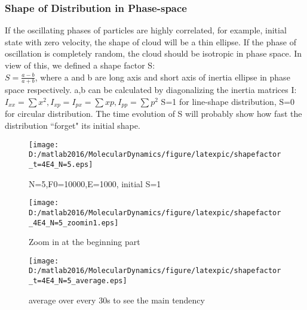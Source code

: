 \documentclass[aps,pre,twocolumn
,groupedaddress]{revtex4-1}
\begin{document}


\subsubsection{Shape of Distribution in Phase-space}
If the oscillating phases of particles are highly correlated, for example, initial state with zero velocity, the shape of cloud will be a thin ellipse. If the phase of oscillation is completely random, the cloud should be isotropic in phase space. In view of this, we defined a shape factor S:
\\$S=\frac{a-b}{a+b}$, where a and b are long axis and short axis of inertia ellipse in phase space respectively. a,b can be calculated by diagonalizing the inertia matrices I: $I_{xx}=\sum{x^2}, I_{xp}=I_{px}=\sum{xp},I_{pp}=\sum{p^2}$
S=1 for line-shape distribution, S=0 for circular distribution.
The time evolution of S will probably show how fast the distribution ``forget" its initial shape.  


\begin{figure}[hbtp]

\centering
\texttt{[image: D:/matlab2016/MolecularDynamics/figure/latexpic/shapefactor\_t=4E4\_N=5.eps]}
\caption{N=5,F0=10000,E=1000, initial S=1}
\end{figure}
\begin{figure}[hbtp]
\centering
\texttt{[image: D:/matlab2016/MolecularDynamics/figure/latexpic/shapefactor\_4E4\_N=5\_zoomin1.eps]} 
\caption{Zoom in at the beginning part}
\end{figure}
\begin{figure}[hbtp]
\centering
\texttt{[image: D:/matlab2016/MolecularDynamics/figure/latexpic/shapefactor\_t=4E4\_N=5\_average.eps]}
\caption{average over every 30s to see the main tendency}
\label{fig:relaxationPS1}
\end{figure}
\end{document}
